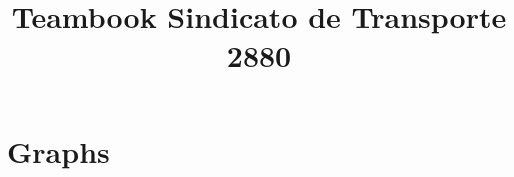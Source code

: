 \documentclass[landscape,twocolumn, 7pt, letterpaper]{book}
\begin{document}
\title{Teambook Sindicato de Transporte 2880}
\maketitle

\tableofcontents

\chapter{Graphs}

\end{document}

